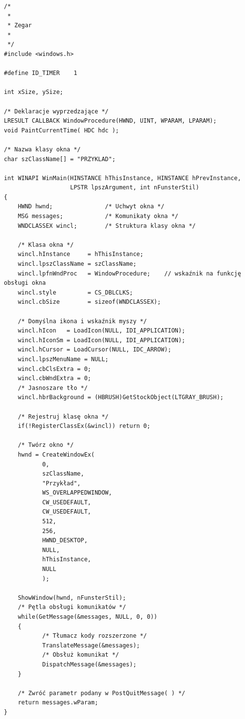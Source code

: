 \begin{scriptsize}
\begin{verbatim}
/*
 *
 * Zegar
 *
 */
#include <windows.h>

#define ID_TIMER    1

int xSize, ySize;

/* Deklaracje wyprzedzające */
LRESULT CALLBACK WindowProcedure(HWND, UINT, WPARAM, LPARAM);
void PaintCurrentTime( HDC hdc );

/* Nazwa klasy okna */
char szClassName[] = "PRZYKLAD";

int WINAPI WinMain(HINSTANCE hThisInstance, HINSTANCE hPrevInstance, 
                   LPSTR lpszArgument, int nFunsterStil)
{
    HWND hwnd;               /* Uchwyt okna */
    MSG messages;            /* Komunikaty okna */
    WNDCLASSEX wincl;        /* Struktura klasy okna */

    /* Klasa okna */
    wincl.hInstance     = hThisInstance;
    wincl.lpszClassName = szClassName;
    wincl.lpfnWndProc   = WindowProcedure;    // wskaźnik na funkcję obsługi okna  
    wincl.style         = CS_DBLCLKS;                 
    wincl.cbSize        = sizeof(WNDCLASSEX);

    /* Domyślna ikona i wskaźnik myszy */
    wincl.hIcon   = LoadIcon(NULL, IDI_APPLICATION);
    wincl.hIconSm = LoadIcon(NULL, IDI_APPLICATION);
    wincl.hCursor = LoadCursor(NULL, IDC_ARROW);
    wincl.lpszMenuName = NULL; 
    wincl.cbClsExtra = 0;   
    wincl.cbWndExtra = 0;   
    /* Jasnoszare tło */
    wincl.hbrBackground = (HBRUSH)GetStockObject(LTGRAY_BRUSH);

    /* Rejestruj klasę okna */
    if(!RegisterClassEx(&wincl)) return 0;

    /* Twórz okno */
    hwnd = CreateWindowEx(
           0,                   
           szClassName,         
           "Przykład",       
           WS_OVERLAPPEDWINDOW, 
           CW_USEDEFAULT,       
           CW_USEDEFAULT,       
           512,                 
           256,                 
           HWND_DESKTOP,        
           NULL,                
           hThisInstance,       
           NULL                 
           );

    ShowWindow(hwnd, nFunsterStil);
    /* Pętla obsługi komunikatów */
    while(GetMessage(&messages, NULL, 0, 0))
    {
           /* Tłumacz kody rozszerzone */
           TranslateMessage(&messages);
           /* Obsłuż komunikat */
           DispatchMessage(&messages);
    }

    /* Zwróć parametr podany w PostQuitMessage( ) */
    return messages.wParam;
}


\end{verbatim}
\end{scriptsize}
